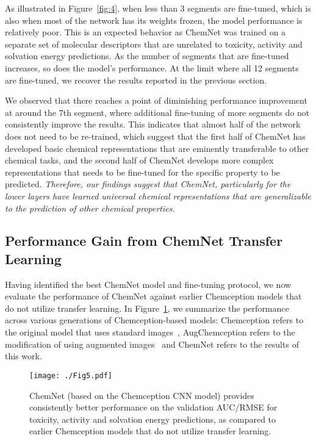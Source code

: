 \documentclass[sigconf]{acmart}
\begin{document}
As illustrated in Figure~\ref{fig:4}, when less than 3 segments are fine-tuned, which is also when most of the network has its weights frozen, the model performance is relatively poor. This is an expected behavior as ChemNet was trained on a separate set of molecular descriptors that are unrelated to toxicity, activity and solvation energy predictions. As the number of segments that are fine-tuned increases, so does the model's performance. At the limit where all 12 segments are fine-tuned, we recover the results reported in the previous section.

We observed that there reaches a point of diminishing performance improvement at around the 7th segment, where additional fine-tuning of more segments do not consistently improve the results. This indicates that almost half of the network does not need to be re-trained, which suggest that the first half of ChemNet has developed basic chemical representations that are eminently transferable to other chemical tasks, and the second half of ChemNet develops more complex representations that needs to be fine-tuned for the specific property to be predicted. \textit{Therefore, our findings suggest that ChemNet, particularly for the lower layers have learned universal chemical representations that are generalizable to the prediction of other chemical properties.} 

\subsection{Performance Gain from ChemNet Transfer Learning}
Having identified the best ChemNet model and fine-tuning protocol, we now evaluate the performance of ChemNet against earlier Chemception models that do not utilize transfer learning. In Figure~\ref{fig:5}, we summarize the performance across various generations of Chemception-based models: Chemception refers to the original model that uses standard images~\cite{goh2017c1}, AugChemception refers to the modification of using augmented images~\cite{goh2017c2} and ChemNet refers to the results of this work.

\begin{figure}[!htbp]
\centering
\texttt{[image: ./Fig5.pdf]}
\caption{\small ChemNet (based on the Chemception CNN model) provides consistently better performance on the validation AUC/RMSE for toxicity, activity and solvation energy predictions, as compared to earlier Chemception models that do not utilize transfer learning.}
\label{fig:5}
\end{figure}
\end{document}
